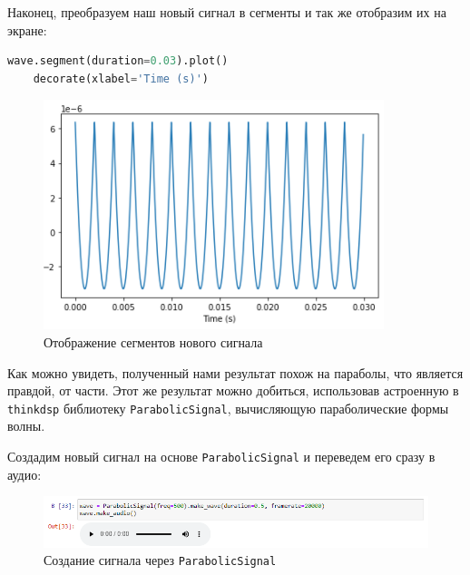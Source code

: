 \documentclass[a4paper]{article}
\begin{document}
            Наконец, преобразуем наш новый сигнал в сегменты и так же отобразим их на экране:
            
\begin{lstlisting}[language=Python, caption= Отображение сегментов нового сигнала]
    wave.segment(duration=0.03).plot()
    decorate(xlabel='Time (s)')
\end{lstlisting}               
            
            \begin{figure}[H]
                \centering
                \includegraphics[width=\textwidth]{ex_6_sawtooth_segment_result.png}
                \caption{Отображение сегментов нового сигнала}
                \label{fig:ex_6_sawtooth_segment_result}
            \end{figure}
            
            Как можно увидеть, полученный нами результат похож на параболы, что является правдой, от части. Этот же результат можно добиться, использовав астроенную в \texttt{thinkdsp} библиотеку \texttt{ParabolicSignal}, вычисляющую параболические формы волны.
            
            Создадим новый сигнал на основе \texttt{ParabolicSignal} и переведем его сразу в аудио:
            
            \begin{figure}[H]
                \centering
                \includegraphics[width=\textwidth]{ex_6_parabolicSignal_audio.png}
                \caption{Создание сигнала через \texttt{ParabolicSignal}}
                \label{fig:ex_6_parabolicSignal_audio}
            \end{figure}
            
\end{document}
